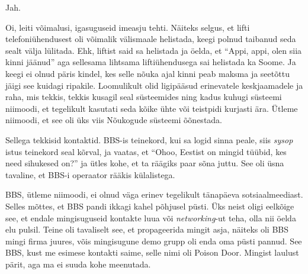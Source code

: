 Jah. 


Oi, leiti võimalusi, igasuguseid imeasju tehti. Näiteks selgus, et lifti 
telefoniühendusest oli võimalik välismaale helistada, keegi polnud taibanud 
seda sealt välja lülitada. Ehk, liftist said sa helistada ja öelda, et 
\enquote{Appi, appi, olen siia kinni jäänud} aga sellesama lihtsama 
liftiühendusega sai helistada ka Soome. Ja keegi ei olnud päris kindel, kes 
selle nõuka ajal kinni peab maksma ja  seetõttu jäigi see kuidagi ripakile. 
Loomulikult olid ligipääsud erinevatele keskjaamadele ja raha, mis tekkis, 
tekkis kusagil seal süsteemides ning kadus kuhugi süsteemi niimoodi, et 
tegelikult kasutati seda kõike ühte või teistpidi kurjasti ära. Ütleme 
niimoodi, et see oli üks viis Nõukogude süsteemi õõnestada.

Sellega tekkisid kontaktid. BBS-is teinekord, kui sa logid sinna peale, siis 
\emph{sysop} istus teinekord seal kõrval, ja vaatas, et \enquote{Ohoo,  Eestist 
on mingid tüübid, kes need sihukesed on?} ja ütles kohe, et ta räägiks paar 
sõna juttu. See oli üsna tavaline, et BBS-i operaator rääkis külalistega.

BBS, ütleme niimoodi, ei olnud väga erinev tegelikult tänapäeva 
sotsiaalmeediast. Selles mõttes, et BBS pandi ikkagi kahel põhjusel püsti. Üks 
neist oligi eelkõige see, et endale mingisuguseid kontakte luua või 
\emph{networking}-ut teha, olla nii öelda elu pulsil. Teine oli tavaliselt see, 
et propageerida mingit asja,  näiteks oli BBS mingi firma juures, võis 
mingisugune demo grupp oli enda oma püsti pannud. See BBS, kust me esimese 
kontakti saime, selle nimi oli Poison Door. Mingist 
laulust pärit, aga ma ei suuda kohe meenutada.

                 
